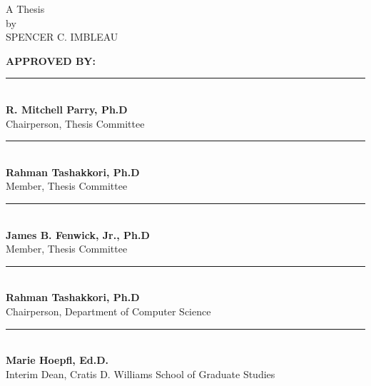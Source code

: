 \vspace*{0.125in}
\vfill
\begin{center}
\begin{spacing}{1.1}
\begin{adjustwidth}{2cm}{2cm}
\begin{center}
\large{\thesistitle}
\end{center}
\end{adjustwidth}
\end{spacing}
\normalsize
\vfill
A Thesis\\
by\\
SPENCER C. IMBLEAU\\
\graduationdate
\end{center}
\vfill

\begin{flushleft}
\textbf{APPROVED BY:}\\
\bigskip
\bigskip


\rule{3in}{.1pt}\\
\textbf{R. Mitchell Parry, Ph.D}\\
Chairperson, Thesis Committee\\
\bigskip
\bigskip

\rule{3in}{.1pt}\\
\textbf{Rahman Tashakkori, Ph.D}\\
Member, Thesis Committee\\
\bigskip
\bigskip

\rule{3in}{.1pt}\\
\textbf{James B. Fenwick, Jr., Ph.D}\\
Member, Thesis Committee\\
\bigskip
\bigskip

\rule{3in}{.1pt}\\
\textbf{Rahman Tashakkori, Ph.D}\\
Chairperson, Department of Computer Science\\
\bigskip
\bigskip

\rule{3in}{.1pt}\\
\textbf{Marie Hoepfl, Ed.D.}\\
Interim Dean, Cratis D. Williams School of Graduate Studies
\end{flushleft}